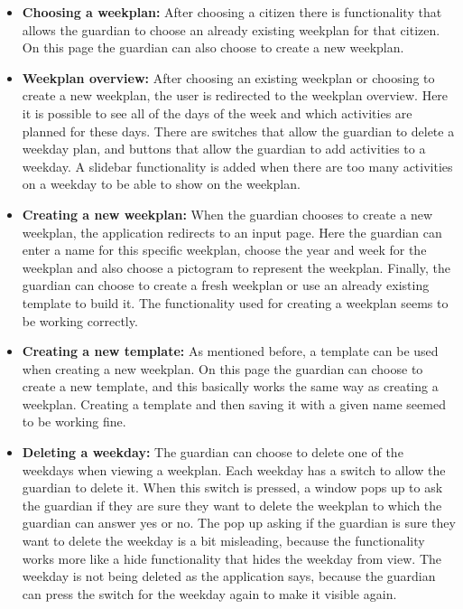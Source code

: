 \begin{itemize}
    \item \textbf{Choosing a weekplan:} After choosing a citizen there is functionality that allows the guardian to choose an already existing weekplan for that citizen.
    On this page the guardian can also choose to create a new weekplan.
    \\
    \item \textbf{Weekplan overview:} After choosing an existing weekplan or choosing to create a new weekplan, the user is redirected to the weekplan overview.
    Here it is possible to see all of the days of the week and which activities are planned for these days.
    There are switches that allow the guardian to delete a weekday plan, and buttons that allow the guardian to add activities to a weekday.
    A slidebar functionality is added when there are too many activities on a weekday to be able to show on the weekplan.
    \\
    \item \textbf{Creating a new weekplan:} When the guardian chooses to create a new weekplan, the application redirects to an input page.
    Here the guardian can enter a name for this specific weekplan, choose the year and week for the weekplan and also choose a pictogram to represent the weekplan.
    Finally, the guardian can choose to create a fresh weekplan or use an already existing template to build it. The functionality used for creating a weekplan seems to be working correctly.
    \\
    \item \textbf{Creating a new template:} As mentioned before, a template can be used when creating a new weekplan.
    On this page the guardian can choose to create a new template, and this basically works the same way as creating a weekplan.
    Creating a template and then saving it with a given name seemed to be working fine.
    \\
    \item \textbf{Deleting a weekday:} The guardian can choose to delete one of the weekdays when viewing a weekplan.
    Each weekday has a switch to allow the guardian to delete it.
    When this switch is pressed, a window pops up to ask the guardian if they are sure they want to delete the weekplan to which the guardian can answer yes or no.
    The pop up asking if the guardian is sure they want to delete the weekday is a bit misleading, because the functionality works more like a hide functionality that hides the weekday from view.
    The weekday is not being deleted as the application says, because the guardian can press the switch for the weekday again to make it visible again.

\end{itemize}
